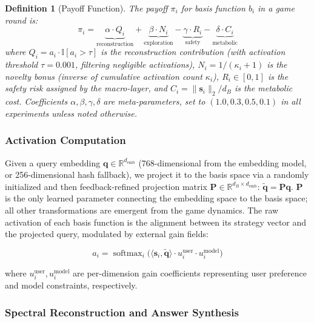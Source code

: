 \documentclass[review]{elsarticle}
\newtheorem{definition}{Definition}
\DeclareMathOperator*{\softmax}{softmax}
\begin{document}
\begin{definition}[Payoff Function]
\label{def:payoff}
The payoff $\pi_i$ for basis function $b_i$ in a game round is:
\begin{equation}
\pi_i = \underbrace{\alpha \cdot Q_i}_{\text{reconstruction}}
+ \underbrace{\beta \cdot N_i}_{\text{exploration}}
- \underbrace{\gamma \cdot R_i}_{\text{safety}}
- \underbrace{\delta \cdot C_i}_{\text{metabolic}}
\label{eq:payoff}
\end{equation}
where $Q_i = a_i \cdot \mathbb{I}[a_i > \tau]$ is the reconstruction
contribution (with activation threshold $\tau = 0.001$, filtering negligible
activations), $N_i = 1/(\kappa_i + 1)$ is the novelty bonus (inverse
of cumulative activation count $\kappa_i$), $R_i \in [0,1]$ is the safety
risk assigned by the macro-layer, and $C_i = \|\mathbf{s}_i\|_2 / d_B$ is
the metabolic cost. Coefficients $\alpha, \beta, \gamma, \delta$ are
meta-parameters, set to $(1.0, 0.3, 0.5, 0.1)$ in all experiments unless
noted otherwise.
\end{definition}

\subsubsection{Activation Computation}

Given a query embedding $\mathbf{q} \in \mathbb{R}^{d_{\text{emb}}}$
(768-dimensional from the embedding model, or 256-dimensional hash fallback),
we project it to the basis space via a randomly initialized and then
feedback-refined projection matrix $\mathbf{P} \in \mathbb{R}^{d_B \times
d_{\text{emb}}}$: $\tilde{\mathbf{q}} = \mathbf{P} \mathbf{q}$. $\mathbf{P}$
is the only learned parameter connecting the embedding space to the basis
space; all other transformations are emergent from the game dynamics. The raw
activation of each
basis function is the alignment between its strategy vector and the
projected query, modulated by external gain fields:

\begin{equation}
a_i = \softmax_i\big( \langle \mathbf{s}_i, \tilde{\mathbf{q}} \rangle
\cdot u^{\text{user}}_i \cdot u^{\text{model}}_i \big)
\label{eq:activation}
\end{equation}

where $u^{\text{user}}_i, u^{\text{model}}_i$ are per-dimension gain
coefficients representing user preference and model constraints,
respectively.

\subsubsection{Spectral Reconstruction and Answer Synthesis}
\end{document}
